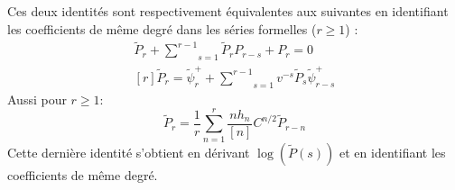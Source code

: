 \documentclass[12pt]{article}
\theoremstyle{definition}
\begin{document}
Ces deux identités sont respectivement équivalentes aux suivantes en identifiant les coefficients de même degré dans les séries formelles ($r\geq 1$) : 
\begin{align}\label{qindalg}
\widetilde{P}_r+\underset{s=1}{\overset{r-1}{\sum}}\widetilde{P}_{r}P_{r-s}+P_r=0\\
[r]\widetilde{P}_r=\widetilde{\psi}^+_r+\underset{s=1}{\overset{r-1}{\sum}}v^{-s}\widetilde{P}_s\widetilde{\psi}^+_{r-s}
\end{align}
Aussi pour $r\geq 1$: \begin{equation}\label{HR}
\widetilde{P}_r=\frac{1}{r}\underset{n=1}{\overset{r}{\sum}}\frac{nh_n}{[n]}C^{n/2}\widetilde{P}_{r-n}
\end{equation}
Cette dernière identité s'obtient en dérivant $\log(\widetilde{P}(s))$ et en identifiant les coefficients de même degré.\vspace{0.5cm}
\end{document}
